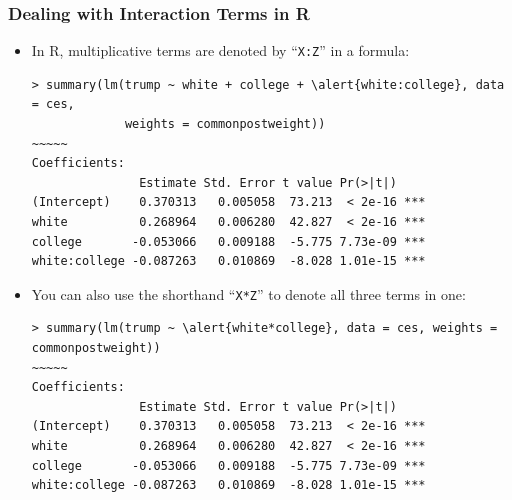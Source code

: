 \documentclass[xcolor=svgnames,9pt,english,aspectratio=169,t]{beamer}
\begin{document}
\begin{frame}[fragile]
\frametitle{Dealing with Interaction Terms in R}
\begin{itemize}
  \item In R, multiplicative terms are denoted by ``{\tt X:Z}'' in a formula:
\medskip
\begin{Verbatim}[fontsize=\footnotesize, frame=single, label=R Code, commandchars=\\\{\}]
> summary(lm(trump ~ white + college + \alert{white:college}, data = ces,
             weights = commonpostweight))
~~~~~
Coefficients:
               Estimate Std. Error t value Pr(>|t|)
(Intercept)    0.370313   0.005058  73.213  < 2e-16 ***
white          0.268964   0.006280  42.827  < 2e-16 ***
college       -0.053066   0.009188  -5.775 7.73e-09 ***
white:college -0.087263   0.010869  -8.028 1.01e-15 ***
\end{Verbatim}

\medskip
  \item You can also use the shorthand ``{\tt X*Z}'' to denote all three terms in one:
\medskip
\begin{Verbatim}[fontsize=\footnotesize, frame=single, label=R Code, commandchars=\\\{\}]
> summary(lm(trump ~ \alert{white*college}, data = ces, weights = commonpostweight))
~~~~~
Coefficients:
               Estimate Std. Error t value Pr(>|t|)
(Intercept)    0.370313   0.005058  73.213  < 2e-16 ***
white          0.268964   0.006280  42.827  < 2e-16 ***
college       -0.053066   0.009188  -5.775 7.73e-09 ***
white:college -0.087263   0.010869  -8.028 1.01e-15 ***
\end{Verbatim}

\end{itemize}

\end{frame}
\end{document}
